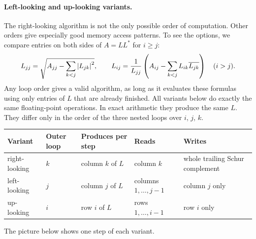 \paragraph{Left-looking and up-looking variants.} The right-looking algorithm is not the only possible order of computation. Other orders give especially good memory access patterns. To see the options, we compare entries on both sides of $A = LL^\ast$ for $i \ge j$:
\begin{equation}
  \label{eq:chol-entries}
  L_{jj} = \sqrt{A_{jj} - \sum_{k<j}\left\lvert L_{jk} \right\rvert^2}, \qquad L_{ij} = \frac{1}{L_{jj}}\left(A_{ij} - \sum_{k<j}L_{ik}\overline{L_{jk}}\right) \quad (i > j).
\end{equation}
Any loop order gives a valid algorithm, as long as it evaluates these formulas using only entries of $L$ that are already finished. All variants below do exactly the same floating-point operations. In exact arithmetic they produce the same $L$. They differ only in the order of the three nested loops over $i$, $j$, $k$.

\begin{center}
\small
\begin{tabular}{lllll}
  \toprule
  Variant & Outer loop & Produces per step & Reads & Writes \\
  \midrule
  right-looking & $k$ & column $k$ of $L$ & column $k$ & whole trailing Schur complement \\
  left-looking & $j$ & column $j$ of $L$ & columns $1, \dots, j - 1$ & column $j$ only \\
  up-looking & $i$ & row $i$ of $L$ & rows $1, \dots, i - 1$ & row $i$ only \\
  \bottomrule
\end{tabular}
\end{center}

The picture below shows one step of each variant.

